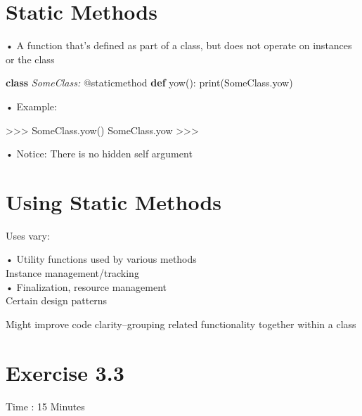 \documentclass[
  letterpaper,
  DIV=11,
  numbers=noendperiod]{scrreprt}
\newenvironment{Shaded}{\begin{snugshade}}{\end{snugshade}}
\newcommand{\ControlFlowTok}[1]{\textcolor[rgb]{0.00,0.23,0.31}{\textbf{#1}}}
\newcommand{\FunctionTok}[1]{\textcolor[rgb]{0.28,0.35,0.67}{#1}}
\newcommand{\NormalTok}[1]{\textcolor[rgb]{0.00,0.23,0.31}{#1}}
\newcommand{\OperatorTok}[1]{\textcolor[rgb]{0.37,0.37,0.37}{#1}}
\newcommand{\OtherTok}[1]{\textcolor[rgb]{0.00,0.23,0.31}{#1}}
\newcommand{\VerbatimStringTok}[1]{\textcolor[rgb]{0.13,0.47,0.30}{#1}}
\newcommand{\WarningTok}[1]{\textcolor[rgb]{0.37,0.37,0.37}{\textit{#1}}}
\begin{document}
\chapter{Static Methods}\label{static-methods}

• A function that's defined as part of a class, but does not operate on
instances or the class

\begin{Shaded}
\begin{Highlighting}[]
\ControlFlowTok{class} \WarningTok{SomeClass:} \OtherTok{@staticmethod} \ControlFlowTok{def}\NormalTok{ yow()}\OperatorTok{:} \FunctionTok{print}\NormalTok{(}\VerbatimStringTok{\textquotesingle{}SomeClass.yow\textquotesingle{}}\NormalTok{) }
\end{Highlighting}
\end{Shaded}

• Example:

\begin{Shaded}
\begin{Highlighting}[]
\NormalTok{\textgreater{}\textgreater{}\textgreater{} SomeClass.yow()  }
\NormalTok{SomeClass.yow  }
\NormalTok{\textgreater{}\textgreater{}\textgreater{} }
\end{Highlighting}
\end{Shaded}

• Notice: There is no hidden self argument


\chapter{Using Static Methods}\label{using-static-methods}

Uses vary:

• Utility functions used by various methods\\
Instance management/tracking\\
• Finalization, resource management\\
Certain design patterns

Might improve code clarity--grouping related functionality together
within a class


\chapter{Exercise 3.3}\label{exercise-3.3}

Time : 15 Minutes
\end{document}
